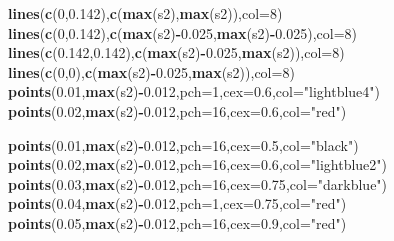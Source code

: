 \documentclass[]{article}
\newenvironment{Shaded}{\begin{snugshade}}{\end{snugshade}}
\newcommand{\DataTypeTok}[1]{\textcolor[rgb]{0.13,0.29,0.53}{#1}}
\newcommand{\DecValTok}[1]{\textcolor[rgb]{0.00,0.00,0.81}{#1}}
\newcommand{\FloatTok}[1]{\textcolor[rgb]{0.00,0.00,0.81}{#1}}
\newcommand{\KeywordTok}[1]{\textcolor[rgb]{0.13,0.29,0.53}{\textbf{#1}}}
\newcommand{\NormalTok}[1]{#1}
\newcommand{\OperatorTok}[1]{\textcolor[rgb]{0.81,0.36,0.00}{\textbf{#1}}}
\newcommand{\StringTok}[1]{\textcolor[rgb]{0.31,0.60,0.02}{#1}}
\begin{document}
\begin{Shaded}
\begin{Highlighting}[]
\KeywordTok{lines}\NormalTok{(}\KeywordTok{c}\NormalTok{(}\DecValTok{0}\NormalTok{,}\FloatTok{0.142}\NormalTok{),}\KeywordTok{c}\NormalTok{(}\KeywordTok{max}\NormalTok{(s2),}\KeywordTok{max}\NormalTok{(s2)),}\DataTypeTok{col=}\DecValTok{8}\NormalTok{)}
\KeywordTok{lines}\NormalTok{(}\KeywordTok{c}\NormalTok{(}\DecValTok{0}\NormalTok{,}\FloatTok{0.142}\NormalTok{),}\KeywordTok{c}\NormalTok{(}\KeywordTok{max}\NormalTok{(s2)}\OperatorTok{-}\FloatTok{0.025}\NormalTok{,}\KeywordTok{max}\NormalTok{(s2)}\OperatorTok{-}\FloatTok{0.025}\NormalTok{),}\DataTypeTok{col=}\DecValTok{8}\NormalTok{)}
\KeywordTok{lines}\NormalTok{(}\KeywordTok{c}\NormalTok{(}\FloatTok{0.142}\NormalTok{,}\FloatTok{0.142}\NormalTok{),}\KeywordTok{c}\NormalTok{(}\KeywordTok{max}\NormalTok{(s2)}\OperatorTok{-}\FloatTok{0.025}\NormalTok{,}\KeywordTok{max}\NormalTok{(s2)),}\DataTypeTok{col=}\DecValTok{8}\NormalTok{)}
\KeywordTok{lines}\NormalTok{(}\KeywordTok{c}\NormalTok{(}\DecValTok{0}\NormalTok{,}\DecValTok{0}\NormalTok{),}\KeywordTok{c}\NormalTok{(}\KeywordTok{max}\NormalTok{(s2)}\OperatorTok{-}\FloatTok{0.025}\NormalTok{,}\KeywordTok{max}\NormalTok{(s2)),}\DataTypeTok{col=}\DecValTok{8}\NormalTok{)}
\KeywordTok{points}\NormalTok{(}\FloatTok{0.01}\NormalTok{,}\KeywordTok{max}\NormalTok{(s2)}\OperatorTok{-}\FloatTok{0.012}\NormalTok{,}\DataTypeTok{pch=}\DecValTok{1}\NormalTok{,}\DataTypeTok{cex=}\FloatTok{0.6}\NormalTok{,}\DataTypeTok{col=}\StringTok{"lightblue4"}\NormalTok{)}
\KeywordTok{points}\NormalTok{(}\FloatTok{0.02}\NormalTok{,}\KeywordTok{max}\NormalTok{(s2)}\OperatorTok{-}\FloatTok{0.012}\NormalTok{,}\DataTypeTok{pch=}\DecValTok{16}\NormalTok{,}\DataTypeTok{cex=}\FloatTok{0.6}\NormalTok{,}\DataTypeTok{col=}\StringTok{"red"}\NormalTok{)}

\KeywordTok{points}\NormalTok{(}\FloatTok{0.01}\NormalTok{,}\KeywordTok{max}\NormalTok{(s2)}\OperatorTok{-}\FloatTok{0.012}\NormalTok{,}\DataTypeTok{pch=}\DecValTok{16}\NormalTok{,}\DataTypeTok{cex=}\FloatTok{0.5}\NormalTok{,}\DataTypeTok{col=}\StringTok{"black"}\NormalTok{)}
\KeywordTok{points}\NormalTok{(}\FloatTok{0.02}\NormalTok{,}\KeywordTok{max}\NormalTok{(s2)}\OperatorTok{-}\FloatTok{0.012}\NormalTok{,}\DataTypeTok{pch=}\DecValTok{16}\NormalTok{,}\DataTypeTok{cex=}\FloatTok{0.6}\NormalTok{,}\DataTypeTok{col=}\StringTok{"lightblue2"}\NormalTok{)}
\KeywordTok{points}\NormalTok{(}\FloatTok{0.03}\NormalTok{,}\KeywordTok{max}\NormalTok{(s2)}\OperatorTok{-}\FloatTok{0.012}\NormalTok{,}\DataTypeTok{pch=}\DecValTok{16}\NormalTok{,}\DataTypeTok{cex=}\FloatTok{0.75}\NormalTok{,}\DataTypeTok{col=}\StringTok{"darkblue"}\NormalTok{)}
\KeywordTok{points}\NormalTok{(}\FloatTok{0.04}\NormalTok{,}\KeywordTok{max}\NormalTok{(s2)}\OperatorTok{-}\FloatTok{0.012}\NormalTok{,}\DataTypeTok{pch=}\DecValTok{1}\NormalTok{,}\DataTypeTok{cex=}\FloatTok{0.75}\NormalTok{,}\DataTypeTok{col=}\StringTok{"red"}\NormalTok{)}
\KeywordTok{points}\NormalTok{(}\FloatTok{0.05}\NormalTok{,}\KeywordTok{max}\NormalTok{(s2)}\OperatorTok{-}\FloatTok{0.012}\NormalTok{,}\DataTypeTok{pch=}\DecValTok{16}\NormalTok{,}\DataTypeTok{cex=}\FloatTok{0.9}\NormalTok{,}\DataTypeTok{col=}\StringTok{"red"}\NormalTok{)}


\end{Highlighting}
\end{Shaded}
\end{document}
